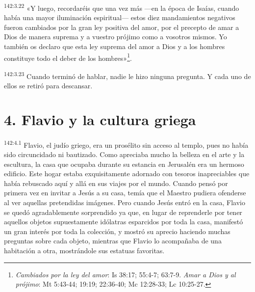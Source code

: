 \par
\textsuperscript{142:3.22} «Y luego, recordaréis que una vez más ---en la época de Isaías, cuando había una mayor iluminación espiritual--- estos diez mandamientos negativos fueron cambiados por la gran ley positiva del amor, por el precepto de amar a Dios de manera suprema y a vuestro prójimo como a vosotros mismos. Yo también os declaro que esta ley suprema del amor a Dios y a los hombres constituye todo el deber de los hombres»\footnote{\textit{Cambiados por la ley del amor}: Is 38:17; 55:4-7; 63:7-9. \textit{Amar a Dios y al prójimo}: Mt 5:43-44; 19:19; 22:36-40; Mc 12:28-33; Lc 10:25-27.}.

\par
\textsuperscript{142:3.23} Cuando terminó de hablar, nadie le hizo ninguna pregunta. Y cada uno de ellos se retiró para descansar.

\section*{4. Flavio y la cultura griega}
\par
\textsuperscript{142:4.1} Flavio, el judío griego, era un prosélito sin acceso al templo, pues no había sido circuncidado ni bautizado. Como apreciaba mucho la belleza en el arte y la escultura, la casa que ocupaba durante su estancia en Jerusalén era un hermoso edificio. Este hogar estaba exquisitamente adornado con tesoros inapreciables que había rebuscado aquí y allá en sus viajes por el mundo. Cuando pensó por primera vez en invitar a Jesús a su casa, temía que el Maestro pudiera ofenderse al ver aquellas pretendidas imágenes. Pero cuando Jesús entró en la casa, Flavio se quedó agradablemente sorprendido ya que, en lugar de reprenderle por tener aquellos objetos supuestamente idólatras esparcidos por toda la casa, manifestó un gran interés por toda la colección, y mostró su aprecio haciendo muchas preguntas sobre cada objeto, mientras que Flavio lo acompañaba de una habitación a otra, mostrándole sus estatuas favoritas.

